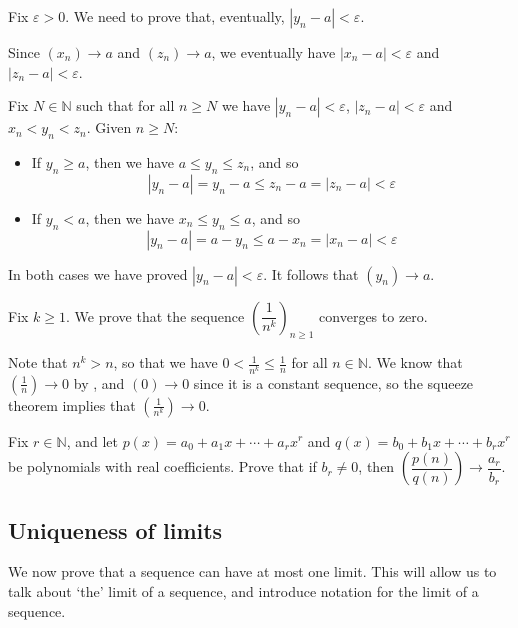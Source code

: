 \begin{cproof}
Fix $\varepsilon > 0$. We need to prove that, eventually, $|y_n - a| < \varepsilon$.

Since $(x_n) \to a$ and $(z_n) \to a$, we eventually have $|x_n - a| < \varepsilon$ and $|z_n - a| < \varepsilon$.

Fix $N \in \mathbb{N}$ such that for all $n \ge N$ we have $|y_n - a| < \varepsilon$, $|z_n - a| < \varepsilon$ and $x_n < y_n < z_n$. Given $n \ge N$:
\begin{itemize}
\item If $y_n \ge a$, then we have $a \le y_n \le z_n$, and so
\[ |y_n-a| = y_n-a \le z_n-a = |z_n-a| < \varepsilon \]
\item If $y_n < a$, then we have $x_n \le y_n \le a$, and so
\[ |y_n-a| = a-y_n \le a-x_n = |x_n-a| < \varepsilon \]
\end{itemize}
In both cases we have proved $|y_n-a| < \varepsilon$. It follows that $(y_n) \to a$.
\end{cproof}

\begin{example}
\label{exOneOverNPowerK}
Fix $k \ge 1$. We prove that the sequence $\left( \dfrac{1}{n^k} \right)_{n \ge 1}$ converges to zero.

Note that $n^k > n$, so that we have $0 < \frac{1}{n^k} \le \frac{1}{n}$ for all $n \in \mathbb{N}$. We know that $(\frac{1}{n}) \to 0$ by , and $(0) \to 0$ since it is a constant sequence, so the squeeze theorem implies that $(\frac{1}{n^k}) \to 0$.
\end{example}

\begin{exercise}
Fix $r \in \mathbb{N}$, and let $p(x) = a_0 + a_1 x + \cdots + a_r x^r$ and $q(x) = b_0 + b_1 x + \cdots + b_r x^r$ be polynomials with real coefficients. Prove that if $b_r \ne 0$, then $\left( \dfrac{p(n)}{q(n)} \right) \to \dfrac{a_r}{b_r}$.
\end{exercise}

\subsection*{Uniqueness of limits}

We now prove that a sequence can have at most one limit. This will allow us to talk about `the' limit of a sequence, and introduce notation for the limit of a sequence.

